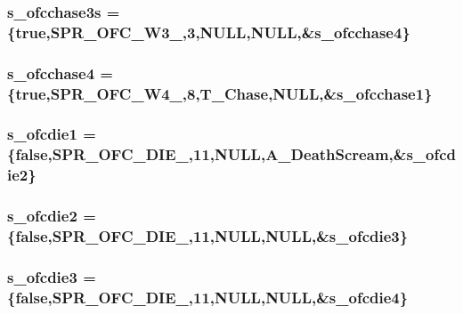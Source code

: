 \label{WL__ACT2_8C_a24320ed1eb7529458e729fe7520820ba}
\hypertarget{WL__ACT2_8C_a4bab1d8d1468401b002c57f4fd40c060}{
\subsubsection[{s\_\-ofcchase3s}]{ {\bf s\_\-ofcchase3s} = \{true,SPR\_\-OFC\_\-W3\_,3,NULL,NULL,\&{\bf s\_\-ofcchase4}\}}}
\label{WL__ACT2_8C_a4bab1d8d1468401b002c57f4fd40c060}
\hypertarget{WL__ACT2_8C_aca9896adaab354e9195aa0c8d220c1de}{
\subsubsection[{s\_\-ofcchase4}]{ {\bf s\_\-ofcchase4} = \{true,SPR\_\-OFC\_\-W4\_,8,T\_\-Chase,NULL,\&{\bf s\_\-ofcchase1}\}}}
\label{WL__ACT2_8C_aca9896adaab354e9195aa0c8d220c1de}
\hypertarget{WL__ACT2_8C_a745d239bab5bd2f02d5fe4d833075321}{
\subsubsection[{s\_\-ofcdie1}]{ {\bf s\_\-ofcdie1} = \{false,SPR\_\-OFC\_\-DIE\_,11,NULL,A\_\-DeathScream,\&{\bf s\_\-ofcdie2}\}}}
\label{WL__ACT2_8C_a745d239bab5bd2f02d5fe4d833075321}
\hypertarget{WL__ACT2_8C_ab1681f9594e8d452542bd52de4bba9c1}{
\subsubsection[{s\_\-ofcdie2}]{ {\bf s\_\-ofcdie2} = \{false,SPR\_\-OFC\_\-DIE\_,11,NULL,NULL,\&{\bf s\_\-ofcdie3}\}}}
\label{WL__ACT2_8C_ab1681f9594e8d452542bd52de4bba9c1}
\hypertarget{WL__ACT2_8C_a96f032403c7e400bb6aa696b73e8a7bc}{
\subsubsection[{s\_\-ofcdie3}]{ {\bf s\_\-ofcdie3} = \{false,SPR\_\-OFC\_\-DIE\_,11,NULL,NULL,\&{\bf s\_\-ofcdie4}\}}}
